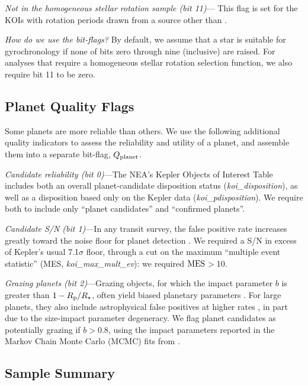 \documentclass[11pt,twocolumn,tighten]{aastex63}
\begin{document}
{\it Not in the homogeneous stellar rotation sample (bit 11)}---
This flag is set for the KOIs with rotation periods
drawn from a source other than \citet{Santos_2019,Santos_2021}.


{\it How do we use the bit-flags?}
By default, we assume that a star is
suitable for gyrochronology if none of bits zero through nine
(inclusive) are raised.
For analyses that require a homogeneous stellar rotation selection
function, we also require bit 11 to be zero. 


\subsection{Planet Quality Flags}
\label{subsec:plflags}
Some planets are more reliable than others.  We use the following
additional quality indicators to assess the reliability and utility of
a planet, and assemble them into a separate bit-flag, $Q_{\rm
planet}$.

{\it Candidate reliability (bit 0)}---The NEA's Kepler Objects of
Interest Table includes both an overall planet-candidate disposition
status ({\it koi\_disposition}), as well as a disposition based only
on the Kepler data ({\it koi\_pdisposition}).  We require both to
include only ``planet candidates'' and ``confirmed planets''. 

{\it Candidate S/N (bit 1)}---In any transit survey, the false
positive rate increases greatly toward the noise floor for planet
detection \citep[e.g.][]{2002ApJ...564..495J}.  We required a S/N in
excess of Kepler's usual 7.1$\sigma$ floor, through a cut on the
maximum ``multiple event statistic'' (MES, {\it koi\_max\_mult\_ev}):
we required ${\rm MES}$$>$10.

{\it Grazing planets (bit 2)}---Grazing objects, for which the impact
parameter $b$ is greater than $1-R_{\rm p}/R_\star$, often yield
biased planetary parameters \citep[e.g.][]{2022AJ....163..111G}.  For
large planets, they also include astrophysical false positives at
higher rates \citep{2016ApJ...822...86M}, in part due to the
size-impact parameter degeneracy.  We flag planet candidates as
potentially grazing if $b>0.8$, using the impact parameters reported
in the Markov Chain Monte Carlo (MCMC) fits from
\citet{Thompson_2018}.


\subsection{Sample Summary}
\label{subsec:tally}
\end{document}
